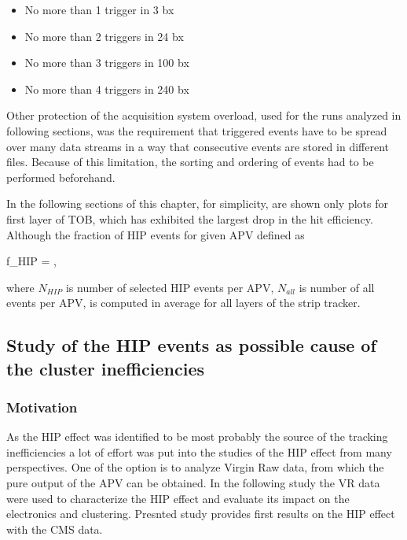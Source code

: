 \begin{itemize}
\item{No more than 1 trigger in 3 bx}
\item{No more than 2 triggers in 24 bx}
\item{No more than 3 triggers in 100 bx}
\item{No more than 4 triggers in 240 bx}
\end{itemize}

Other protection of the acquisition system overload, used for the runs analyzed in following sections, was the requirement that triggered events have to be spread over many data streams in a way that consecutive events are stored in different files. Because of this limitation, the sorting and ordering of events had to be performed beforehand.

In the following sections of this chapter, for simplicity, are shown only plots for first layer of TOB, which has exhibited the largest drop in the hit efficiency. Although the fraction of HIP events for given APV defined as


{
f_{HIP} = ,
}

where $N_{HIP}$ is number of selected HIP events per APV, $N_{all}$ is number of all events per APV, is computed in average for all layers of the strip tracker.


\subsection{Study of the HIP events as possible cause of the cluster inefficiencies~\label{sec:firstStudy}}

\subsubsection{Motivation}

As the HIP effect was identified to be most probably the source of the tracking inefficiencies a lot of effort was put into the studies of the HIP effect from many perspectives. One of the option is to analyze Virgin Raw data, from which the pure output of the APV can be obtained. In the following study the VR data were used to characterize the HIP effect and evaluate its impact on the electronics and clustering. Presnted study provides first results on the HIP effect with the CMS data.

